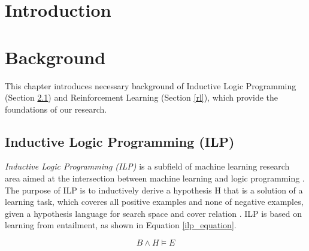 \documentclass[12pt,twoside]{report}
\theoremstyle{plain}
\theoremstyle{definition}
\begin{document}
\clearpage{\pagestyle{empty}\cleardoublepage}
\setcounter{page}{1}
\fancyhead[LE,RO]{\slshape \rightmark}
\fancyhead[LO,RE]{\slshape \leftmark}

\listoffigures
\listoftables

\chapter{Introduction}
\label{introduction}



\chapter{Background}
\label{background}

This chapter introduces necessary background of Inductive Logic Programming (Section \ref{ilp}) and Reinforcement Learning (Section \ref{rl}), which provide the foundations of our research.

\section{Inductive Logic Programming (ILP)}
\label{ilp}

\textit{Inductive Logic Programming (ILP)} is a subfield of machine learning research area aimed at the intersection between machine learning and logic programming \cite{Muggleton1991}. The purpose of ILP is to inductively derive a hypothesis H that is a solution of a learning task, which coveres all positive examples and none of negative examples, given a hypothesis language for search space and cover relation \cite{DeRaedt1997}. ILP is based on learning from entailment, as shown in Equation \ref{ilp_equation}.

\begin{equation}
B \wedge H \models E
\end{equation}
\label{ilp_equation}
\end{document}
